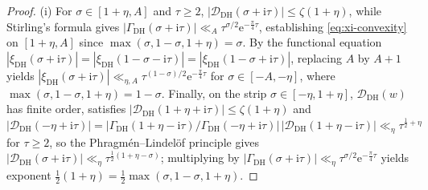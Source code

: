 \documentclass[11pt,a4paper,reqno]{amsart}
\theoremstyle{definition}
\theoremstyle{remark}
\numberwithin{equation}{section}
\newcommand{\ii}{\mathrm{i}}
\newcommand{\ee}{\mathrm{e}}
\begin{document}
\begin{proof}
(i) For $\sigma \in [1 + \eta, A]$ and $\tau \ge 2$, $|\mathcal{D}_{\mathrm{DH}}(\sigma + \ii\tau)| \le \zeta(1 + \eta)$, while Stirling's formula gives $|\Gamma_{\mathrm{DH}}(\sigma + \ii\tau)| \ll_A \tau^{\sigma/2}\ee^{-\frac{\pi}{4}\tau}$, establishing \eqref{eq:xi-convexity} on $[1+\eta, A]$ since $\max(\sigma, 1-\sigma, 1+\eta) = \sigma$. By the functional equation $|\xi_{\mathrm{DH}}(\sigma + \ii\tau)| = |\xi_{\mathrm{DH}}(1 - \sigma - \ii\tau)| = |\xi_{\mathrm{DH}}(1 - \sigma + \ii\tau)|$, replacing $A$ by $A + 1$ yields $|\xi_{\mathrm{DH}}(\sigma + \ii\tau)| \ll_{\eta,A} \tau^{(1-\sigma)/2}\ee^{-\frac{\pi}{4}\tau}$ for $\sigma \in [-A, -\eta]$, where $\max(\sigma, 1-\sigma, 1+\eta) = 1 - \sigma$. Finally, on the strip $\sigma \in [-\eta, 1+\eta]$, $\mathcal{D}_{\mathrm{DH}}(w)$ has finite order, satisfies $|\mathcal{D}_{\mathrm{DH}}(1+\eta+\ii\tau)| \le \zeta(1+\eta)$ and $|\mathcal{D}_{\mathrm{DH}}(-\eta+\ii\tau)| = |\Gamma_{\mathrm{DH}}(1+\eta-\ii\tau)/\Gamma_{\mathrm{DH}}(-\eta+\ii\tau)|\,|\mathcal{D}_{\mathrm{DH}}(1+\eta-\ii\tau)| \ll_\eta \tau^{\frac{1}{2}+\eta}$ for $\tau \ge 2$, so the Phragm\'en--Lindel\"of principle gives $|\mathcal{D}_{\mathrm{DH}}(\sigma + \ii\tau)| \ll_\eta \tau^{\frac{1}{2}(1 + \eta - \sigma)}$; multiplying by $|\Gamma_{\mathrm{DH}}(\sigma + \ii\tau)| \ll_\eta \tau^{\sigma/2}\ee^{-\frac{\pi}{4}\tau}$ yields exponent $\frac{1}{2}(1 + \eta) = \frac{1}{2}\max(\sigma, 1-\sigma, 1+\eta)$.


\end{proof}
\end{document}
